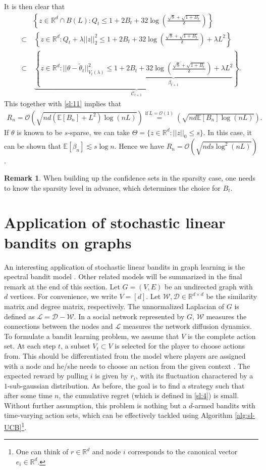 \documentclass[letterpaper,10pt,openright,openany]{book}
\numberwithin{equation}{section}
\theoremstyle{plain}
\theoremstyle{definition}
\newtheorem{Rem}[Th]{Remark}
\def\R{{\mathbb R}}
\def\E{{\mathbb E}}
\def\R{{\mathbb R}}
\def\t{{\theta}}
\begin{document}
It is then clear that 
\begin{align*}
&\left\{z\in\R^d\cap B(L): Q_t\leq 1+2B_t+32\log\left(\frac{\sqrt{8}+\sqrt{1+B_t}}{\delta}\right) \right\}\\
\subset&\ \left\{z\in\R^d: Q_t +\lambda ||z||_2^2\leq 1+2B_t+32\log\left(\frac{\sqrt{8}+\sqrt{1+B_t}}{\delta}\right) +\lambda L^2\right\}\\
\subset&\ \underbrace{\left\{z\in\R^d: ||\t-\tilde\t_t||^2_{V_t(\lambda)}\leq \underbrace{1+2B_t+32\log\left(\frac{\sqrt{8}+\sqrt{1+B_t}}{\delta}\right)+\lambda L^2}_{\beta_{t+1}} \right\}}_{\mathcal C_{t+1}}. 
\end{align*}
This together with \eqref{sl:11} implies that 
\begin{align*}
R_n = \mathcal O \left(\sqrt{nd(\E[B_n]+L^2)\log(nL)}\right)\stackrel{\text{if}\ L=\mathcal O(1)}{=}\left(\sqrt{nd\E[B_n]\log(nL)}\right).
\end{align*}
If $\t$ is known to be $s$-sparse, we can take $\Theta = \{z\in\R^d: ||z||_0\leq s\}$. In this case, it can be shown that $\E[\beta_n] \lesssim s\log n$. Hence we have $R_n = \mathcal O \left(\sqrt{nds\log^2(nL)}\right)$.
\begin{Rem}
When building up the confidence sets in the sparsity case, one needs to know the sparsity level in advance, which determines the choice for $B_t$. 
\end{Rem} 



\section{Application of stochastic linear bandits on graphs}
An interesting application of stochastic linear bandits in graph learning is the spectral bandit model \cite{valko2014spectral}. 
Other related models will be summarized in the final remark at the end of this section. 
Let $G=(V, E)$ be an undirected graph with $d$ vertices. 
For convenience, we write $V=[d]$. 
Let $\mathcal W, \mathcal D\in\R^{d\times d}$ be the similarity matrix and degree matrix, respectively. 
The unnormalized Laplacian of $G$ is defined as $\mathcal L=\mathcal D-\mathcal W$. 
In a social network represented by $G$, $\mathcal W$ measures the connections between the nodes and $\mathcal L$ measures the network diffusion dynamics. 
To formulate a bandit learning problem, we assume that $V$ is the complete action set.
At each step $t$, a subset $V_t\subset V$ is selected for the player to choose actions from.
This should be differentiated from the model where players are assigned with a node and he/she needs to choose an action from the given context \cite{cesa2013gang}.  
The expected reward by pulling $i$ is given by $r_i$, with its fluctuation charactered by a $1$-sub-gaussian distribution. 
As before, the goal is to find a strategy such that after some time $n$, the cumulative regret (which is defined in \eqref{sl:4}) is small.  
Without further assumption, this problem is nothing but a $d$-armed bandits with time-varying action sets, which can be effectively tackled using Algorithm \ref{alg:sl-UCB}\footnote{One can think of $r\in\R^d$ and node $i$ corresponds to the canonical vector $e_i\in\R^d$. }. 
\end{document}
